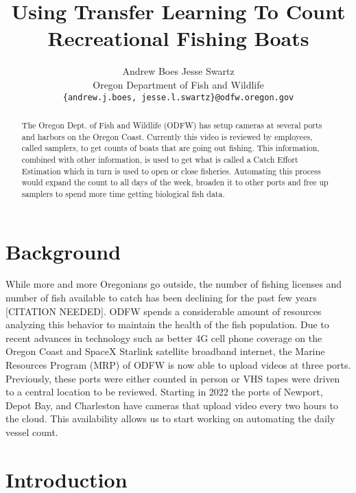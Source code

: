 \documentclass[10pt,twocolumn,letterpaper]{article}
\begin{document}
\title{ Using Transfer Learning To Count Recreational Fishing Boats }

\author{Andrew Boes \hspace{30pt} Jesse Swartz \\
Oregon Department of Fish and Wildlife\\
{\tt\small \{andrew.j.boes, jesse.l.swartz\}@odfw.oregon.gov}
}
\maketitle

\begin{abstract}
   The Oregon Dept. of Fish and Wildlife (ODFW) has setup cameras at several ports and harbors on the Oregon Coast. Currently this video is reviewed by employees, called samplers, to get counts of boats that are going out fishing. This information, combined with other information, is used to get what is called a Catch Effort Estimation which in turn is used to open or close fisheries. Automating this process would expand the count to all days of the week, broaden it to other ports and free up samplers to spend more time getting biological fish data.
\end{abstract}

\section{Background}

While more and more Oregonians go outside, the number of fishing licenses and number of fish available to catch has been declining for the past few years [CITATION NEEDED]. ODFW spends a considerable amount of resources analyzing this behavior to maintain the health of the fish population. Due to recent advances in technology such as better 4G cell phone coverage on the Oregon Coast and SpaceX Starlink satellite broadband internet, the Marine Resources Program (MRP) of ODFW is now able to upload videos at three ports. Previously, these ports were either counted in person or VHS tapes were driven to a central location to be reviewed. Starting in 2022 the ports of Newport, Depot Bay, and Charleston have cameras that upload video every two hours to the cloud. This availability allows us to start working on automating the daily vessel count.\\[-5pt]

\section{Introduction}
\end{document}
